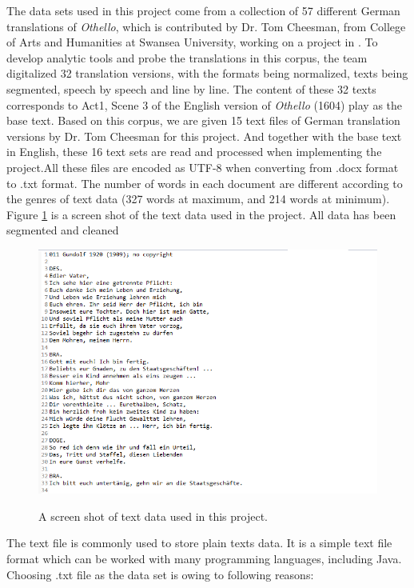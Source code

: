 The data sets used in this project come from a collection of 57 different German translations of \emph{Othello}, which is contributed by Dr. Tom Cheesman, from College of Arts and Humanities at Swansea University, working on a project in \cite{Tom2012}. To develop analytic tools and probe the translations in this corpus, the team digitalized 32 translation versions, with the formats being normalized, texts being segmented, speech by speech and line by line. The content of these 32 texts corresponds to Act1, Scene 3 of the English version of \emph{Othello} (1604) play as the base text. Based on this corpus, we are given 15 text files of German translation versions by Dr. Tom Cheesman for this project. And together with the base text in English, these 16 text sets are read and processed when implementing the project.All these files are encoded as UTF-8 when converting from .docx format to .txt format. The number of words in each document are different according to the genres of text data (327 words at maximum, and 214 words at minimum). Figure \ref{fig:dataExample} is a screen shot of the text data used in the project. All data has been segmented and cleaned
\begin{figure}[H]
	\centering    
	\includegraphics[scale=0.8]{Figs/Data-example}\\[1ex]
	\caption{A screen shot of text data used in this project.}
	\label{fig:dataExample}
\end{figure}
The text file is commonly used to store plain texts data. It is a simple text file format which can be worked with many programming languages, including Java. Choosing .txt file as the data set is owing to following reasons:


